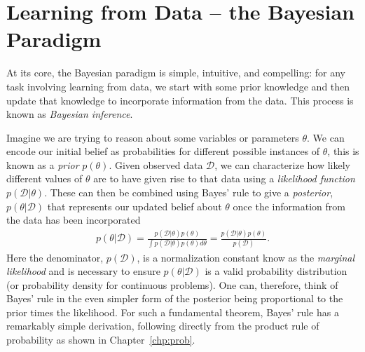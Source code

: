 
\section{Learning from Data -- the Bayesian Paradigm}
\label{sec:bayes:paradigm}

At its core, the Bayesian paradigm is simple, intuitive, and compelling: for any task involving
learning from data, we start with some prior knowledge and then update that knowledge to
incorporate information from the data.  This process is known as \emph{Bayesian inference}.

Imagine we are trying to reason about some variables
or parameters $\theta$.  We can encode our initial belief as probabilities for different
possible instances of $\theta$, this is known as a \emph{prior} $p(\theta)$.  Given observed data
$\mathcal{D}$, we can characterize how likely different values of $\theta$ are to have given rise
to that data using a \emph{likelihood function} $p(\mathcal{D}|\theta)$.  These can then be
combined using Bayes' rule to give a \emph{posterior}, $p(\theta | \mathcal{D})$ that 
represents our updated belief about $\theta$ once the information from the data has been
incorporated
\begin{align}
	\label{eq:bayes:bayes}
	p(\theta | \mathcal{D}) = \frac{p(\mathcal{D} | \theta)p(\theta)}{\int p(\mathcal{D} | \theta)p(\theta) d\theta} 
	= \frac{p(\mathcal{D} | \theta)p(\theta)}{p(\mathcal{D})}.
\end{align}
Here the denominator, $p(\mathcal{D})$, is a normalization constant know as the \emph{marginal
	likelihood} and is necessary to ensure $p(\theta | \mathcal{D})$ is a valid probability distribution
(or probability density for continuous problems).  One can, therefore, think of Bayes' rule in the even
simpler form of the posterior being proportional to the prior times the likelihood.
For such a fundamental theorem, Bayes' rule has a remarkably simple derivation, following directly
from the product rule of probability as shown in Chapter~\ref{chp:prob}.

